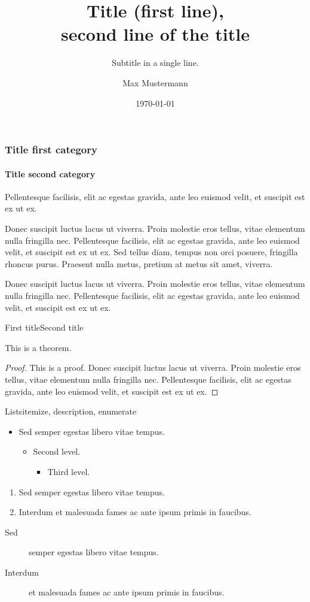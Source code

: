 \documentclass{beamer}
\title[Short Title]{%
  Title (first line),\\
  second line of the title
}
\subtitle{Subtitle in a single line.}
\author{Max Mustermann}
\date{\today}
\institute[TU Wien]
{%
  Institute of Computer Engineering\\
  TU Wien\\
  -\\
  182.709 Operating Systems UE\\
  WS 2016/17
}
\begin{document}
\begin{frame}
  \titlepage
\end{frame}

\begin{frame}
  \frametitle{Title first category}
  \framesubtitle{Title second category}

  Pellentesque facilisis, elit ac egestas gravida, ante leo euismod velit, et
  suscipit est ex ut ex.

  Donec suscipit luctus lacus ut viverra. Proin molestie eros tellus, vitae
  elementum nulla fringilla nec. Pellentesque facilisis, elit ac egestas
  gravida, ante leo euismod velit, et suscipit est ex ut ex. Sed tellus diam,
  tempus non orci posuere, fringilla rhoncus purus. Praesent nulla metus,
  pretium at metus sit amet, viverra.

  Donec suscipit luctus lacus ut viverra. Proin molestie eros tellus, vitae
  elementum nulla fringilla nec. Pellentesque facilisis, elit ac egestas
  gravida, ante leo euismod velit, et suscipit est ex ut ex.
\end{frame}

\begin{frame}{First title}{Second title}
  \begin{theorem}
    This is a theorem.
  \end{theorem}
  \begin{proof}
    This is a proof.  Donec suscipit luctus lacus ut viverra. Proin molestie
    eros tellus, vitae elementum nulla fringilla nec. Pellentesque facilisis,
    elit ac egestas gravida, ante leo euismod velit, et suscipit est ex ut ex.
  \end{proof}
\end{frame}

\begin{frame}{Lists}{itemize, description, enumerate}
  \begin{itemize}
  \item Sed semper egestas libero vitae tempus.
    \begin{itemize}
    \item Second level.
      \begin{itemize}
      \item Third level.
      \end{itemize}
    \end{itemize}
  \end{itemize}

  \begin{enumerate}
  \item Sed semper egestas libero vitae tempus.
  \item Interdum et malesuada fames ac ante ipsum primis in faucibus.
  \end{enumerate}

  \begin{description}
  \item[Sed] semper egestas libero vitae tempus.
  \item[Interdum] et malesuada fames ac ante ipsum primis in faucibus.
  \end{description}
\end{frame}
\end{document}
